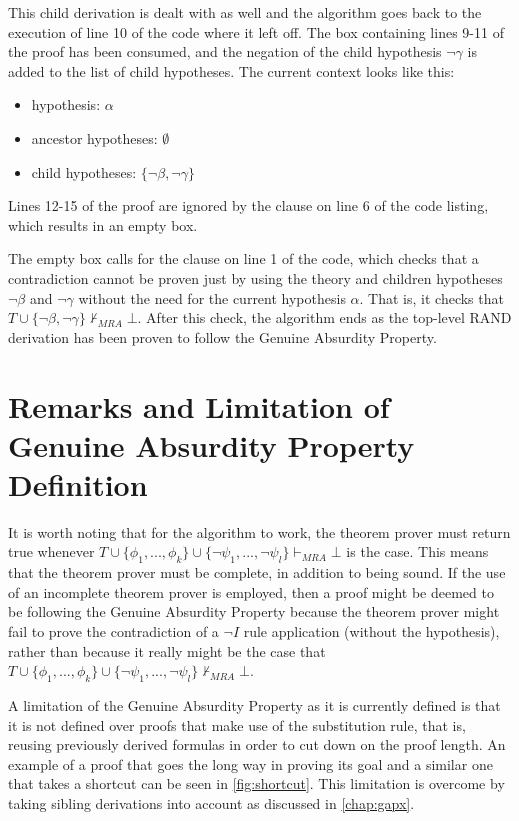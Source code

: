 \documentclass[11pt,twoside,a4paper]{report}
\begin{document}
This child derivation is dealt with as well and the algorithm goes back to the execution of line 10 of the code where it left off. The box containing lines 9-11 of the proof has been consumed, and the negation of the child hypothesis $\neg\gamma$ is added to the list of child hypotheses. The current context looks like this:
\begin{itemize}
\item
hypothesis: $\alpha$
\item
ancestor hypotheses: $\emptyset$
\item
child hypotheses: $\{\neg\beta, \neg\gamma\}$
\end{itemize}

Lines 12-15 of the proof are ignored by the clause on line 6 of the code listing, which results in an empty box.

The empty box calls for the clause on line 1 of the code, which checks that a contradiction cannot be proven just by using the theory and children hypotheses $\neg\beta$ and $\neg\gamma$ without the need for the current hypothesis $\alpha$. That is, it checks that $T\cup\{\neg\beta, \neg\gamma\}\nvdash_{MRA}\bot$. After this check, the algorithm ends as the top-level RAND derivation has been proven to follow the Genuine Absurdity Property.

\section{Remarks and Limitation of Genuine Absurdity Property Definition}
It is worth noting that for the algorithm to work, the theorem prover must return true whenever $T\cup\{\phi_1, ..., \phi_k\}\cup\{\neg\psi_1, ..., \neg\psi_l\}\vdash_{MRA}\bot$ is the case. This means that the theorem prover must be complete, in addition to being sound. If the use of an incomplete theorem prover is employed, then a proof might be deemed to be following the Genuine Absurdity Property because the theorem prover might fail to prove the contradiction of a $\neg I$ rule application (without the hypothesis), rather than because it really might be the case that $T\cup\{\phi_1, ..., \phi_k\}\cup\{\neg\psi_1, ..., \neg\psi_l\}\nvdash_{MRA}\bot$. 

A limitation of the Genuine Absurdity Property as it is currently defined is that it is not defined over proofs that make use of the substitution rule, that is, reusing previously derived formulas in order to cut down on the proof length. An example of a proof that goes the long way in proving its goal and a similar one that takes a shortcut can be seen in \autoref{fig:shortcut}. This limitation is overcome by taking sibling derivations into account as discussed in \autoref{chap:gapx}.
\end{document}
